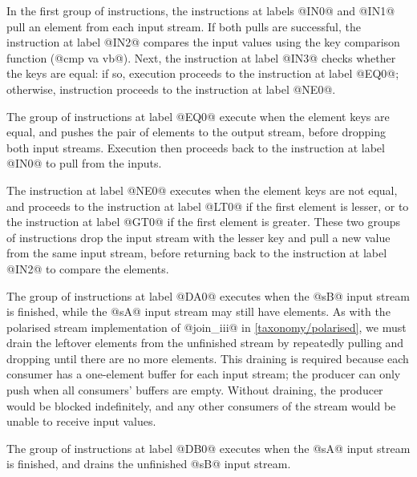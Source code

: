 In the first group of instructions, the instructions at labels @IN0@ and @IN1@ pull an element from each input stream.
If both pulls are successful, the instruction at label @IN2@ compares the input values using the key comparison function (@cmp va vb@).
Next, the instruction at label @IN3@ checks whether the keys are equal: if so, execution proceeds to the instruction at label @EQ0@; otherwise, instruction proceeds to the instruction at label @NE0@.

The group of instructions at label @EQ0@ execute when the element keys are equal, and pushes the pair of elements to the output stream, before dropping both input streams.
Execution then proceeds back to the instruction at label @IN0@ to pull from the inputs.

The instruction at label @NE0@ executes when the element keys are not equal, and proceeds to the instruction at label @LT0@ if the first element is lesser, or to the instruction at label @GT0@ if the first element is greater.
These two groups of instructions drop the input stream with the lesser key and pull a new value from the same input stream, before returning back to the instruction at label @IN2@ to compare the elements.

The group of instructions at label @DA0@ executes when the @sB@ input stream is finished, while the @sA@ input stream may still have elements.
As with the polarised stream implementation of @join_iii@ in \autoref{taxonomy/polarised}, we must drain the leftover elements from the unfinished stream by repeatedly pulling and dropping until there are no more elements.
This draining is required because each consumer has a one-element buffer for each input stream; the producer can only push when all consumers' buffers are empty.
Without draining, the producer would be blocked indefinitely, and any other consumers of the stream would be unable to receive input values.


The group of instructions at label @DB0@ executes when the @sA@ input stream is finished, and drains the unfinished @sB@ input stream.

